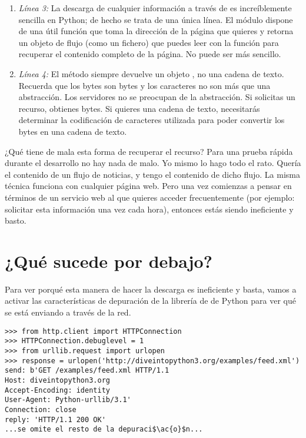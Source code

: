 \begin{enumerate}

\item \emph{Línea 3:} La descarga de cualquier información a través de  es increíblemente sencilla en Python; de hecho se trata de una única línea. El módulo  dispone de una útil función  que toma la dirección de la página que quieres y retorna un objeto de flujo (como un fichero) que puedes leer con la función  para recuperar el contenido completo de la página. No puede ser más sencillo.

\item \emph{Línea 4:} El método  siempre devuelve un objeto , no una cadena de texto. Recuerda que los bytes son bytes y los caracteres no son más que una abstracción. Los servidores  no se preocupan de la abstracción. Si solicitas un recurso, obtienes bytes. Si quieres una cadena de texto, necesitarás determinar la codificación de caracteres utilizada para poder convertir los bytes en una cadena de texto.

\end{enumerate}

¿Qué tiene de mala esta forma de recuperar el recurso? Para una prueba rápida durante el desarrollo no hay nada de malo. Yo mismo lo hago todo el rato. Quería el contenido de un flujo de noticias, y tengo el contenido de dicho flujo. La misma técnica funciona con cualquier página web. Pero una vez comienzas a pensar en términos de un servicio web al que quieres acceder frecuentemente (por ejemplo: solicitar esta información una vez cada hora), entonces estás siendo ineficiente y basto.

\section{¿Qué sucede por debajo?}

Para ver porqué esta manera de hacer la descarga es ineficiente y basta, vamos a activar las características de depuración de la librería de  de Python para ver qué se está enviando a través de la red.

\noindent\begin{minipage}{\textwidth}
\begin{lstlisting}[mathescape=True]
>>> from http.client import HTTPConnection
>>> HTTPConnection.debuglevel = 1
>>> from urllib.request import urlopen
>>> response = urlopen('http://diveintopython3.org/examples/feed.xml')
send: b'GET /examples/feed.xml HTTP/1.1
Host: diveintopython3.org            
Accept-Encoding: identity           
User-Agent: Python-urllib/3.1'     
Connection: close
reply: 'HTTP/1.1 200 OK'
...se omite el resto de la depuraci$\ac{o}$n...
\end{lstlisting}
\end{minipage}

